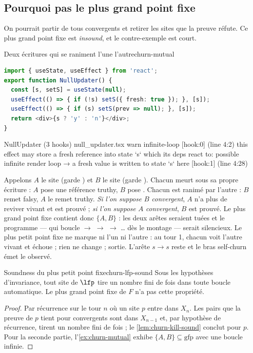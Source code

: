 \subsection{Pourquoi pas le plus grand point fixe}

On pourrait partir de \og tous convergents\fg{} et retirer les sites que la preuve réfute.
Ce plus grand point fixe est \emph{insound}, et le contre-exemple est court.

\begin{exemple}{Deux écritures qui se raniment l'une l'autre}{churn-mutual}
\begin{lstlisting}[language=TypeScript,caption={\file{/tmp/ch15/null_updater.tsx}},label={lst:churn-null-updater}]
import { useState, useEffect } from 'react';
export function NullUpdater() {
  const [s, setS] = useState(null);
  useEffect(() => { if (!s) setS({ fresh: true }); }, [s]);
  useEffect(() => { if (s) setS(prev => null); }, [s]);
  return <div>{s ? 'y' : 'n'}</div>;
}
\end{lstlisting}
\begin{sortie}
  NullUpdater  (3 hooks)  null_updater.tsx
    warn   infinite-loop  [hook:0]  (line 4:2)  this effect may store a fresh reference into state `s` which its deps react to: possible infinite render loop
       → a fresh value is written to state `s` here [hook:1] (line 4:28)
\end{sortie}
\end{exemple}

Appelons $A$ le site  (garde ) et $B$ le site
 (garde ). Chacun meurt sous sa propre écriture : $A$ pose
une référence truthy, $B$ pose . Chacun est ranimé par l'autre : $B$ remet
 falsy, $A$ le remet truthy. \emph{Si l'on suppose $B$ convergent}, $A$ n'a plus de
reviver vivant et est prouvé ; \emph{si l'on suppose $A$ convergent}, $B$ est prouvé. Le
plus grand point fixe contient donc $\{A, B\}$ : les deux arêtes seraient tuées et le
programme --- qui boucle  $\to$  $\to$  $\to$ … dès le
montage --- serait silencieux. Le plus petit point fixe ne marque ni l'un ni l'autre : au
tour 1, chacun voit l'autre vivant et échoue ; rien ne change ; sortie. L'arête
 $s \to s$ reste et le bras self-churn émet le \Warning{} observé.

\begin{theoreme}{Soundness du plus petit point fixe}{churn-lfp-sound}
Sous les hypothèses d'invariance, tout site de $\lfp$ tire un nombre fini de fois dans
toute boucle automatique. Le plus grand point fixe de $F$ n'a pas cette propriété.
\end{theoreme}
\begin{proof}
Par récurrence sur le tour $n$ où un site $p$ entre dans $X_n$. Les pairs que la preuve
de $p$ tient pour convergents sont dans $X_{n-1}$ et, par hypothèse de récurrence, tirent
un nombre fini de fois ; le \cref{lem:churn-kill-sound} conclut pour $p$. Pour la
seconde partie, l'\cref{ex:churn-mutual} exhibe $\{A, B\} \subseteq \mathrm{gfp}$ avec une
boucle infinie.
\end{proof}

